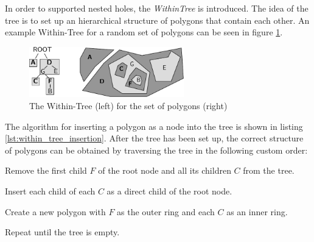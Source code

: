 In order to supported nested holes, the \emph{WithinTree} is introduced. The idea of the tree is to set up an hierarchical structure of polygons that contain each other. An example Within-Tree for a random set of polygons can be seen in figure \ref{fig:within_tree}.

\begin{figure}[ht]
  \vspace{1em}
  \centering
  \includegraphics[width=0.6\textwidth]{graphics/development/application/within_tree}
  \caption{The Within-Tree (left) for the set of polygons (right)}
  \label{fig:within_tree}
\end{figure}

The algorithm for inserting a polygon as a node into the tree is shown in listing \ref{lst:within_tree_insertion}. After the tree has been set up, the correct structure of polygons can be obtained by traversing the tree in the following custom order:

\begin{compactenum}
  \item Remove the first child $F$ of the root node and all its children $C$ from the tree.
  \item Insert each child of each $C$ as a direct child of the root node.
  \item Create a new polygon with $F$ as the outer ring and each $C$ as an inner ring.
  \item Repeat until the tree is empty.
\end{compactenum}



